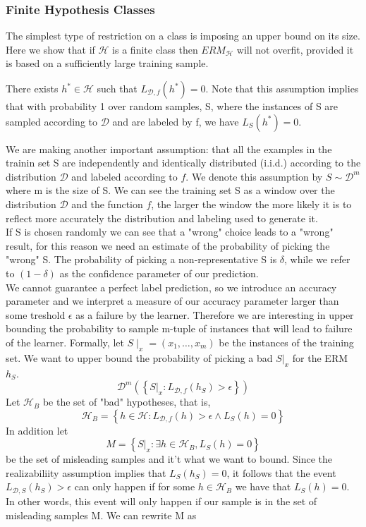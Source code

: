 \subsubsection{Finite Hypothesis Classes}
The simplest type of restriction on a class is imposing an upper bound on its size. Here we show that if $\mathcal{H}$ is a finite class then $ERM_\mathcal{H}$ will not overfit, provided it is based on a sufficiently large training sample. 
\begin{definition}
    There exists $h^* \in \mathcal{H}$ such that $L_{\mathcal{D},f} (h^*) = 0$. Note that this assumption implies that with probability 1 over random samples, S, where the instances of S are sampled according to $\mathcal{D}$ and are labeled by f, we have $L_S(h^*) = 0$.
\end{definition}
We are making another important assumption: that all the examples in the trainin set S are independently and identically distributed (i.i.d.) according to the distribution $\mathcal{D}$ and labeled according to $f$. We denote this assumption by $S \sim \mathcal{D}^m$ where m is the size of S. We can see the training set S as a window over the distribution $\mathcal{D}$ and the function $f$, the larger the window the more likely it is to reflect more accurately the distribution and labeling used to generate it.\\
If S is chosen randomly we can see that a "wrong" choice leads to a "wrong" result, for this reason we need an estimate of the probability of picking the "wrong" S. The probability of picking a non-representative S is $\delta$, while we refer to $(1-\delta)$ as the confidence parameter of our prediction. \\We cannot guarantee a perfect label prediction, so we introduce an accuracy parameter and we interpret a measure of our accuracy parameter larger than some treshold $\epsilon$ as a failure by the learner.
Therefore we are interesting in upper bounding the probability to sample m-tuple of instances that will lead to failure of the learner. Formally, let $S\mid_x = (x_{1}, \ldots,x_{m})$ be the instances of the training set. We want to upper bound the probability of picking a bad $S\rvert_x$ for the ERM $h_S$.
\[ 
    \mathcal{D}^m\left( \left\{ S\rvert_x : L_{\mathcal{D},f}(h_S)>\epsilon \right\} \right) 
\]
Let $\mathcal{H}_B$ be the set of "bad" hypotheses, that is,
\[ 
    \mathcal{H}_B = \left\{ h \in \mathcal{H}: L_{\mathcal{D},f}(h)>\epsilon \wedge L_S(h)=0 \right\} 
\]In addition let
\[ 
    M = \left\{ S\rvert_x : \exists h \in \mathcal{H}_B, L_S(h)= 0 \right\}
\]be the set of misleading samples and it't what we want to bound. Since the realizabiliity assumption implies that $L_S(h_S)=0$, it follows that the event $L_{\mathcal{D},S}(h_S)>\epsilon$ can only happen if for some $h\in \mathcal{H}_B$ we have that $L_S(h) =0$. In other words, this event will only happen if our sample is in the set of misleading samples M. We can rewrite M as

